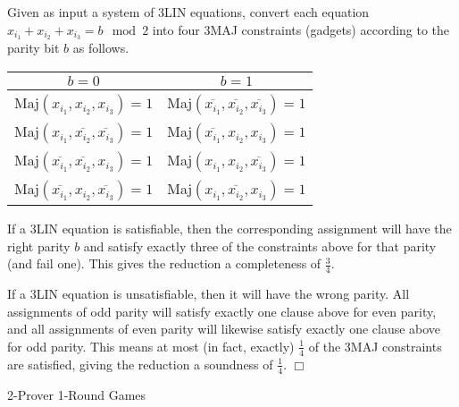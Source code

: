 \documentclass[12pt]{article}
\makeatletter
\renewcommand{\section}{\@startsection{section}{1}{0mm}
   {\baselineskip}%
   {\baselineskip}{\normalfont\normalsize}}%
\makeatother
\begin{document}
\begin{enumerate}
Given as input a system of 3LIN equations, convert each equation
$x_{i_1} + x_{i_2} + x_{i_3} = b \mod 2$ into
four 3MAJ constraints (gadgets) according to the parity bit $b$ as follows.

\begin{tabular}{|c|c|}
\hline
$b=0$ & $b=1$\\
\hline
Maj$(x_{i_1}, x_{i_2}, x_{i_3}) = 1$ &
Maj$(\overline{x_{i_1}}, \overline{x_{i_2}}, \overline{x_{i_3}}) = 1$ \\
Maj$(x_{i_1}, \overline{x_{i_2}}, \overline{x_{i_3}}) = 1$ &
Maj$(\overline{x_{i_1}}, x_{i_2}, x_{i_3}) = 1$ \\
Maj$(\overline{x_{i_1}}, \overline{x_{i_2}}, x_{i_3}) = 1$ &
Maj$(x_{i_1}, x_{i_2}, \overline{x_{i_3}}) = 1$ \\
Maj$(\overline{x_{i_1}}, x_{i_2}, \overline{x_{i_3}}) = 1$ &
Maj$(x_{i_1}, \overline{x_{i_2}}, x_{i_3}) = 1$ \\
\hline
\end{tabular}

If a 3LIN equation is satisfiable, then the corresponding assignment will
have the right parity $b$ and satisfy exactly three of the constraints above
for that parity (and fail one).
This gives the reduction a completeness of $\frac{3}{4}$.

If a 3LIN equation is unsatisfiable, then it will have the wrong parity.
All assignments of odd parity will satisfy exactly one clause
above for even parity, and all assignments of even parity will likewise
satisfy exactly one clause above for odd parity.
This means at most (in fact, exactly) $\frac{1}{4}$ of the 3MAJ constraints
are satisfied, giving the reduction a soundness of $\frac{1}{4}$.
$\Box$

\end{enumerate}

\setcounter{section}{1}
\section{2-Prover 1-Round Games}
\end{document}

